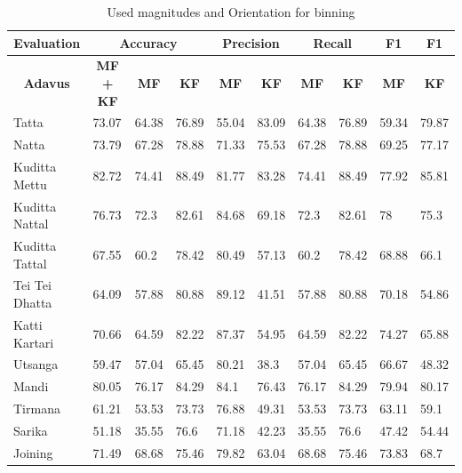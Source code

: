 \begin{table}[]
\centering
\hspace*{-1cm}
\begin{tabular}{|l|l|l|l|l|l|l|l|l|l|}
\hline
\multicolumn{1}{|c|}{\textbf{Evaluation}} &
  \multicolumn{3}{c|}{\textbf{Accuracy}} &
  \multicolumn{2}{c|}{\textbf{Precision}} &
  \multicolumn{2}{c|}{\textbf{Recall}} &
  \multicolumn{1}{c|}{\textbf{F1}} &
  \multicolumn{1}{c|}{\textbf{F1}} \\ \hline
\multicolumn{1}{|c|}{\textbf{Adavus}} &
  \multicolumn{1}{c|}{\textbf{MF + KF}} &
  \multicolumn{1}{c|}{\textbf{MF}} &
  \multicolumn{1}{c|}{\textbf{KF}} &
  \multicolumn{1}{c|}{\textbf{MF}} &
  \multicolumn{1}{c|}{\textbf{KF}} &
  \multicolumn{1}{c|}{\textbf{MF}} &
  \multicolumn{1}{c|}{\textbf{KF}} &
  \multicolumn{1}{c|}{\textbf{MF}} &
  \multicolumn{1}{c|}{\textbf{KF}} \\ \hline
Tatta          & 73.07 & 64.38 & 76.89 & 55.04 & 83.09 & 64.38 & 76.89 & 59.34 & 79.87 \\ \hline
Natta          & 73.79 & 67.28 & 78.88 & 71.33 & 75.53 & 67.28 & 78.88 & 69.25 & 77.17 \\ \hline
Kuditta Mettu  & 82.72 & 74.41 & 88.49 & 81.77 & 83.28 & 74.41 & 88.49 & 77.92 & 85.81 \\ \hline
Kuditta Nattal & 76.73 & 72.3  & 82.61 & 84.68 & 69.18 & 72.3  & 82.61 & 78    & 75.3  \\ \hline
Kuditta Tattal & 67.55 & 60.2  & 78.42 & 80.49 & 57.13 & 60.2  & 78.42 & 68.88 & 66.1  \\ \hline
Tei Tei Dhatta & 64.09 & 57.88 & 80.88 & 89.12 & 41.51 & 57.88 & 80.88 & 70.18 & 54.86 \\ \hline
Katti Kartari  & 70.66 & 64.59 & 82.22 & 87.37 & 54.95 & 64.59 & 82.22 & 74.27 & 65.88 \\ \hline
Utsanga        & 59.47 & 57.04 & 65.45 & 80.21 & 38.3  & 57.04 & 65.45 & 66.67 & 48.32 \\ \hline
Mandi          & 80.05 & 76.17 & 84.29 & 84.1  & 76.43 & 76.17 & 84.29 & 79.94 & 80.17 \\ \hline
Tirmana        & 61.21 & 53.53 & 73.73 & 76.88 & 49.31 & 53.53 & 73.73 & 63.11 & 59.1  \\ \hline
Sarika         & 51.18 & 35.55 & 76.6  & 71.18 & 42.23 & 35.55 & 76.6  & 47.42 & 54.44 \\ \hline
Joining        & 71.49 & 68.68 & 75.46 & 79.82 & 63.04 & 68.68 & 75.46 & 73.83 & 68.7  \\ \hline
\end{tabular}
\caption{Used magnitudes and Orientation for binning}
\label{tab:Ch06T002}
\end{table}








